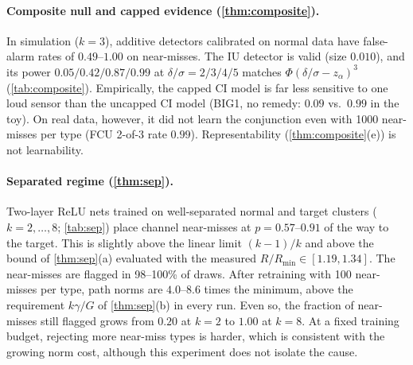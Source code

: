 \documentclass{article}
\theoremstyle{definition}
\theoremstyle{remark}
\renewcommand{\1}{\mathbf{1}}
\begin{document}
\paragraph{Composite null and capped evidence (\cref{thm:composite}).} In simulation ($k=3$), additive detectors calibrated on normal data have false-alarm rates of $0.49$--$1.00$ on near-misses. The IU detector is valid (size $0.010$), and its power $0.05/0.42/0.87/0.99$ at $\delta/\sigma=2/3/4/5$ matches $\Phi(\delta/\sigma-z_\alpha)^3$ (\cref{tab:composite}). Empirically, the capped CI model is far less sensitive to one loud sensor than the uncapped CI model (BIG1, no remedy: $0.09$ vs.\ $0.99$ in the toy). On real data, however, it did not learn the conjunction even with 1000 near-misses per type (FCU 2-of-3 rate $0.99$). Representability (\cref{thm:composite}(e)) is not learnability.

\paragraph{Separated regime (\cref{thm:sep}).} Two-layer ReLU nets trained on well-separated normal and target clusters ($k=2,\dots,8$; \cref{tab:sep}) place channel near-misses at $p=0.57$--$0.91$ of the way to the target. This is slightly above the linear limit $(k-1)/k$ and above the bound of \cref{thm:sep}(a) evaluated with the measured $R/R_{\min}\in[1.19,1.34]$. The near-misses are flagged in 98--100\% of draws. After retraining with 100 near-misses per type, path norms are $4.0$--$8.6$ times the minimum, above the requirement $k\gamma/G$ of \cref{thm:sep}(b) in every run. Even so, the fraction of near-misses still flagged grows from $0.20$ at $k=2$ to $1.00$ at $k=8$. At a fixed training budget, rejecting more near-miss types is harder, which is consistent with the growing norm cost, although this experiment does not isolate the cause.

\begin{table}[t]
\centering
\caption{Toy replica: flag rates at 1\% false alarms (mean $\pm$ s.d., 3 seeds) for each training remedy, LSTM. All remedies add the same number of label-0 windows. The fault effect moved to unrelated sensors (OFF) is flagged at $\le0.02$ under every remedy.}
\label{tab:toy}
\small

\end{table}
\end{document}
